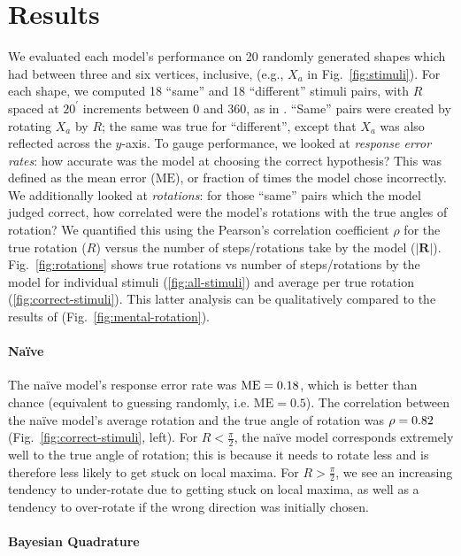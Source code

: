 \documentclass{article} %
\newcommand{\ME}[0]{\mathrm{ME}}
\newcommand{\naive}[0]{na\"ive}
\newcommand{\Naive}[0]{Na\"ive}
\begin{document}
\section{Results}

We evaluated each model's performance on 20 randomly generated shapes
which had between three and six vertices, inclusive, (e.g., $X_a$ in
Fig.~\ref{fig:stimuli}). For each shape, we computed 18 ``same'' and
18 ``different'' stimuli pairs, with $R$ spaced at $20^\prime$
increments between 0 and 360, as in \cite{Shepard1971}. ``Same'' pairs
were created by rotating $X_a$ by $R$; the same was true for
``different'', except that $X_a$ was also reflected across the
$y$-axis. To gauge performance, we looked at \textit{response error
  rates}: how accurate was the model at choosing the correct
hypothesis? This was defined as the mean error ($\ME{}$), or fraction
of times the model chose incorrectly.  We additionally looked at
\textit{rotations}: for those ``same'' pairs which the model judged
correct, how correlated were the model's rotations with the true
angles of rotation?  We quantified this using the Pearson's
correlation coefficient $\rho$ for the true rotation ($R$) versus the
number of steps/rotations take by the model ($\vert
\mathbf{R}\vert$). Fig.~\ref{fig:rotations} shows true rotations vs
number of steps/rotations by the model for individual stimuli
(\ref{fig:all-stimuli}) and average per true rotation
(\ref{fig:correct-stimuli}). This latter analysis can be qualitatively
compared to the results of \cite{Shepard1971}
(Fig.~\ref{fig:mental-rotation}).

\paragraph{\Naive{}} 

The \naive{} model's response error rate was $\NaiveME{}$, which is
better than chance (equivalent to guessing randomly,
i.e. $\ME{}=0.5$). The correlation between the \naive{} model's
average rotation and the true angle of rotation was $\rho=0.82{}$
(Fig.~\ref{fig:correct-stimuli}, left). For $R<\frac{\pi}{2}$, the
\naive{} model corresponds extremely well to the true angle of
rotation; this is because it needs to rotate less and is therefore
less likely to get stuck on local maxima. For $R>\frac{\pi}{2}$, we
see an increasing tendency to under-rotate due to getting stuck on
local maxima, as well as a tendency to over-rotate if the wrong
direction was initially chosen.

\paragraph{Bayesian Quadrature}
\end{document}
